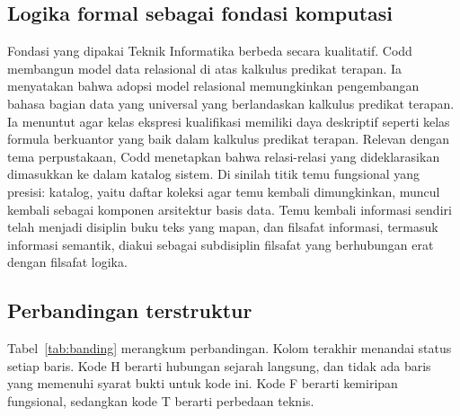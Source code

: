 \documentclass[12pt,a4paper]{article}
\begin{document}
\subsection{Logika formal sebagai fondasi komputasi}

Fondasi yang dipakai Teknik Informatika berbeda secara kualitatif. Codd membangun model data relasional di atas kalkulus predikat terapan. Ia menyatakan bahwa adopsi model relasional memungkinkan pengembangan bahasa bagian data yang universal yang berlandaskan kalkulus predikat terapan.\autocite[381]{codd1970} Ia menuntut agar kelas ekspresi kualifikasi memiliki daya deskriptif seperti kelas formula berkuantor yang baik dalam kalkulus predikat terapan.\autocite[381]{codd1970} Relevan dengan tema perpustakaan, Codd menetapkan bahwa relasi-relasi yang dideklarasikan dimasukkan ke dalam katalog sistem.\autocite[381]{codd1970} Di sinilah titik temu fungsional yang presisi: katalog, yaitu daftar koleksi agar temu kembali dimungkinkan, muncul kembali sebagai komponen arsitektur basis data. Temu kembali informasi sendiri telah menjadi disiplin buku teks yang mapan,\autocite{manning2008} dan filsafat informasi, termasuk informasi semantik, diakui sebagai subdisiplin filsafat yang berhubungan erat dengan filsafat logika.\autocite{adriaans2023}

\subsection{Perbandingan terstruktur}

Tabel~\ref{tab:banding} merangkum perbandingan. Kolom terakhir menandai status setiap baris. Kode H berarti hubungan sejarah langsung, dan tidak ada baris yang memenuhi syarat bukti untuk kode ini. Kode F berarti kemiripan fungsional, sedangkan kode T berarti perbedaan teknis.
\end{document}
